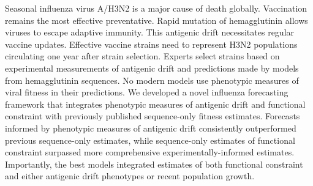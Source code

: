 Seasonal influenza virus A/H3N2 is a major cause of death globally.
Vaccination remains the most effective preventative.
Rapid mutation of hemagglutinin allows viruses to escape adaptive immunity.
This antigenic drift necessitates regular vaccine updates.
Effective vaccine strains need to represent H3N2 populations circulating one year after strain selection.
Experts select strains based on experimental measurements of antigenic drift and predictions made by models from hemagglutinin sequences.
No modern models use phenotypic measures of viral fitness in their predictions.
We developed a novel influenza forecasting framework that integrates phenotypic measures of antigenic drift and functional constraint with previously published sequence-only fitness estimates.
Forecasts informed by phenotypic measures of antigenic drift consistently outperformed previous sequence-only estimates, while sequence-only estimates of functional constraint surpassed more comprehensive experimentally-informed estimates.
Importantly, the best models integrated estimates of both functional constraint and either antigenic drift phenotypes or recent population growth.
